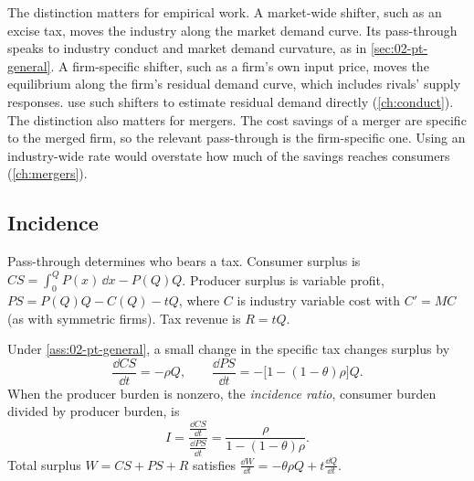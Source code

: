The distinction matters for empirical work. A market-wide shifter, such as an excise tax, moves the industry
along the market demand curve. Its pass-through speaks to industry conduct and market demand curvature, as in
\cref{sec:02-pt-general}. A firm-specific shifter, such as a firm's own input price, moves the equilibrium along
the firm's residual demand curve, which includes rivals' supply responses. \citet{BakerBresnahan1988} use such
shifters to estimate residual demand directly (\cref{ch:conduct}). The distinction also matters for mergers.
The cost savings of a merger are specific to the merged firm, so the relevant pass-through is the
firm-specific one. Using an industry-wide rate would overstate how much of the savings reaches consumers
(\cref{ch:mergers}).

\subsection{Incidence}\label{sec:02-pt-incidence}

Pass-through determines who bears a tax. Consumer surplus is $CS = \int_0^Q P(x)\,\dd x - P(Q)Q$. Producer surplus
is variable profit, $PS = P(Q)Q - C(Q) - tQ$, where $C$ is industry variable cost with $C' = MC$ (as with
symmetric firms). Tax revenue is $R = tQ$.

\begin{proposition}\label{prop:02-incidence}
Under \cref{ass:02-pt-general}, a small change in the specific tax changes surplus by
\begin{equation*}
\frac{\dd CS}{\dd t} = -\rho Q, \qquad \frac{\dd PS}{\dd t} = -\bigl[1 - (1 - \theta)\rho\bigr]Q .
\end{equation*}
When the producer burden is nonzero, the \emph{incidence ratio}, consumer burden divided by producer burden, is
\begin{equation}\label{eq:02-incidence}
I = \frac{\frac{\dd CS}{\dd t}}{\frac{\dd PS}{\dd t}} = \frac{\rho}{1 - (1 - \theta)\rho} .
\end{equation}
Total surplus $W = CS + PS + R$ satisfies $\frac{\dd W}{\dd t} = -\theta\rho Q + t\frac{\dd Q}{\dd t}$.
\end{proposition}

